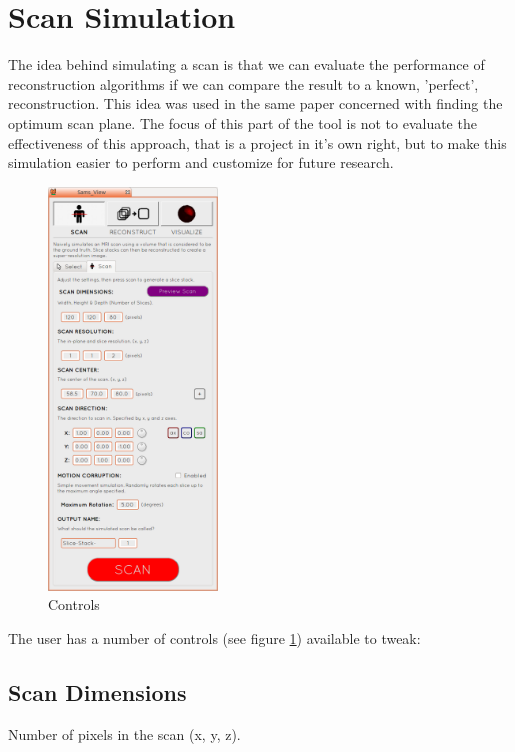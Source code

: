 \section{Scan Simulation}\label{implementation:simulatescan}
The idea behind simulating a scan is that we can evaluate the performance of reconstruction algorithms if we can compare the result to a known, 'perfect', reconstruction. This idea was used in the same paper concerned with finding the optimum scan plane\cite{uncertaintysvd}. The focus of this part of the tool is not to evaluate the effectiveness of this approach, that is a project in it's own right, but to make this simulation easier to perform and customize for future research.

\begin{figure}
  \vspace{-20pt}
  \includegraphics[width=0.4\textwidth]{images/scan_simulation/scan_settings.png}
  \caption{Controls}\label{fig:scansettings}
\end{figure}

The user has a number of controls (see figure \ref{fig:scansettings}) available to tweak:

\subsection*{Scan Dimensions}
Number of pixels in the scan (x, y, z).

